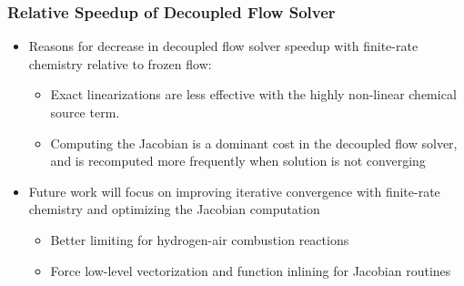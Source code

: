 \documentclass{beamer}
\begin{document}
\begin{frame}
  \frametitle{Relative Speedup of Decoupled Flow Solver}
  \begin{itemize}
    \item Reasons for decrease in decoupled flow solver speedup with finite-rate
      chemistry relative to frozen flow:
    \begin{itemize}
      \item Exact linearizations are less effective with the highly non-linear
        chemical source term.
      \item Computing the Jacobian is a dominant cost in the decoupled flow
        solver, and is recomputed more frequently when solution is not
        converging
    \end{itemize}
  \item Future work will focus on improving iterative convergence with
    finite-rate chemistry and optimizing the Jacobian computation 
    \begin{itemize}
      \item Better limiting for hydrogen-air combustion reactions
      \item Force low-level vectorization and function inlining for Jacobian
        routines
    \end{itemize}
  \end{itemize}
\end{frame}
\end{document}
